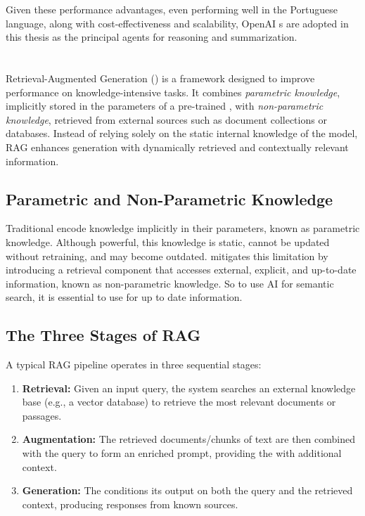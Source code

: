 Given these performance advantages, even performing well in the Portuguese language, along with cost-effectiveness and scalability, OpenAI s are adopted in this thesis as the principal agents for reasoning and summarization.


\section{}
\label{sec:rag}

Retrieval-Augmented Generation () is a framework designed to improve performance on knowledge-intensive  tasks. It combines \textit{parametric knowledge}, implicitly stored in the parameters of a pre-trained , with \textit{non-parametric knowledge}, retrieved from external sources such as document collections or databases. Instead of relying solely on the static internal knowledge of the model, RAG enhances generation with dynamically retrieved and contextually relevant information.

\subsection{Parametric and Non-Parametric Knowledge}
Traditional  encode knowledge implicitly in their parameters, known as parametric knowledge. Although powerful, this knowledge is static, cannot be updated without retraining, and may become outdated.  
 mitigates this limitation by introducing a retrieval component that accesses external, explicit, and up-to-date information, known as non-parametric knowledge. So to use AI for semantic search, it is essential to use  for up to date information.

\subsection{The Three Stages of RAG}
A typical RAG pipeline operates in three sequential stages:
\begin{enumerate}
    \item \textbf{Retrieval:} Given an input query, the system searches an external knowledge base (e.g., a vector database) to retrieve the most relevant documents or passages.  
    \item \textbf{Augmentation:} The retrieved documents/chunks of text are then combined with the query to form an enriched prompt, providing the  with additional context.  
    \item \textbf{Generation:} The  conditions its output on both the query and the retrieved context, producing responses from known sources. 
\end{enumerate}

